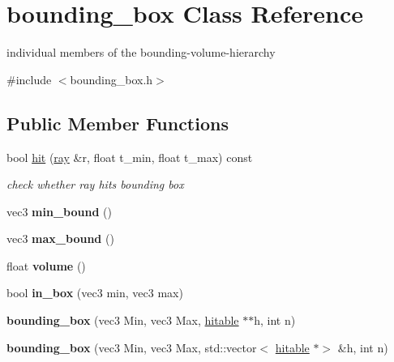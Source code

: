 \hypertarget{classbounding__box}{}\section{bounding\+\_\+box Class Reference}
\label{classbounding__box}


individual members of the bounding-\/volume-\/hierarchy  




{\ttfamily \#include $<$bounding\+\_\+box.\+h$>$}

\subsection*{Public Member Functions}
\begin{DoxyCompactItemize}
\item 
\mbox{\label{classbounding__box_a6b2939be917436f6129c85ad3447895e}} 
bool \hyperlink{classbounding__box_a6b2939be917436f6129c85ad3447895e}{hit} (\hyperlink{classray}{ray} \&r, float t\+\_\+min, float t\+\_\+max) const
\begin{DoxyCompactList}\small\item\em check whether ray hits bounding box \end{DoxyCompactList}\item 
\mbox{\label{classbounding__box_a3d09525eb8ea353cf06e3c6b2ed7fa14}} 
vec3 {\bfseries min\+\_\+bound} ()
\item 
\mbox{\label{classbounding__box_a1df427cb2a119936314782fe7106ca16}} 
vec3 {\bfseries max\+\_\+bound} ()
\item 
\mbox{\label{classbounding__box_a96cc03ca301e8ee9d418c8af75f6daa6}} 
float {\bfseries volume} ()
\item 
\mbox{\label{classbounding__box_a65ad67dce99f3bea6db51e9e0a66f8bc}} 
bool {\bfseries in\+\_\+box} (vec3 min, vec3 max)
\item 
\mbox{\label{classbounding__box_ab92abf4b4ed8f2f870c93b4ddb4be356}} 
{\bfseries bounding\+\_\+box} (vec3 Min, vec3 Max, \hyperlink{classhitable}{hitable} $\ast$$\ast$h, int n)
\item 
\mbox{\label{classbounding__box_a894d1a3fb2f2891327c280ef4ca0c71f}} 
{\bfseries bounding\+\_\+box} (vec3 Min, vec3 Max, std\+::vector$<$ \hyperlink{classhitable}{hitable} $\ast$$>$ \&h, int n)
\end{DoxyCompactItemize}
